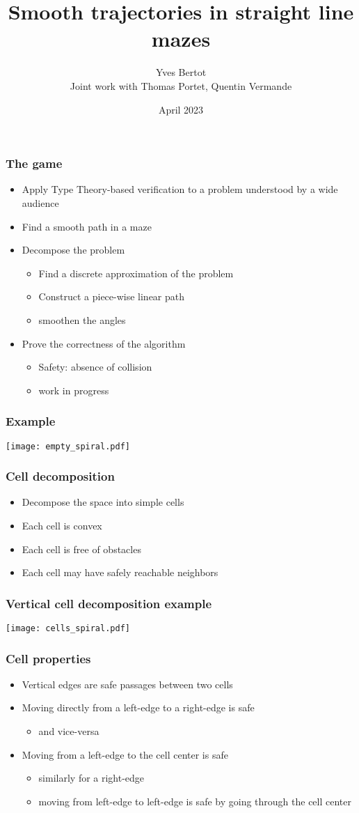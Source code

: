 \documentclass[compress]{beamer}
\title{Smooth trajectories in straight line mazes}
\author{Yves Bertot\\
Joint work with Thomas Portet, Quentin Vermande}
\date{April 2023}
\begin{document}
\maketitle
\begin{frame}
\frametitle{The game}
\begin{itemize}
\item Apply Type Theory-based verification to a problem understood by a
  wide audience
\item Find a smooth path in a maze
\item Decompose the problem
\begin{itemize}
\item Find a discrete approximation of the problem
\item Construct a piece-wise linear path
\item smoothen the angles
\end{itemize}
\item Prove the correctness of the algorithm
\begin{itemize}
\item Safety: absence of collision
\item work in progress
\end{itemize}
\end{itemize}
\end{frame}
\begin{frame}
\frametitle{Example}
\texttt{[image: empty\_spiral.pdf]}
\end{frame}
\begin{frame}
\frametitle{Cell decomposition}
\begin{itemize}
\item Decompose the space into simple cells
\item Each cell is convex
\item Each cell is free of obstacles
\item Each cell may have safely reachable neighbors
\end{itemize}
\end{frame}
\begin{frame}
\frametitle{Vertical cell decomposition example}
\texttt{[image: cells\_spiral.pdf]}
\end{frame}
\begin{frame}
\frametitle{Cell properties}
\begin{itemize}
\item Vertical edges are safe passages between two cells
\item Moving directly from a left-edge to a right-edge is safe
\begin{itemize}
\item and vice-versa
\end{itemize}
\item Moving from a left-edge to the cell center is safe
\begin{itemize}
\item similarly for a right-edge
\item moving from left-edge to left-edge is safe by going through the
  cell center
\end{itemize}
\end{itemize}
\end{frame}
\end{document}
